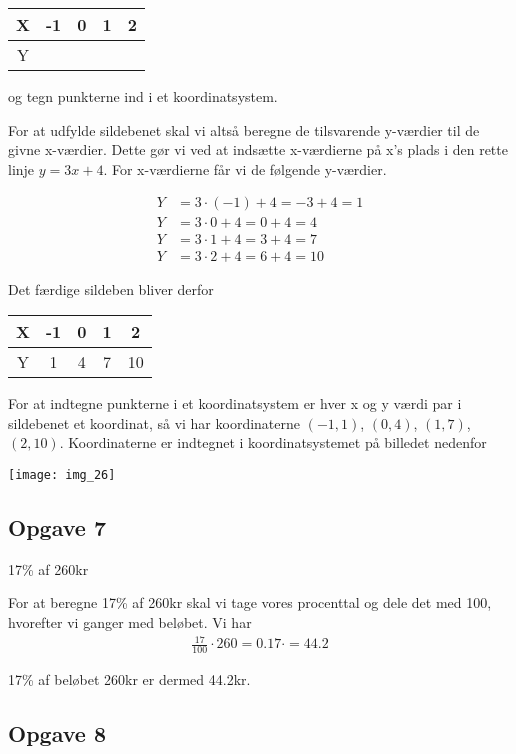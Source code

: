 \begin{tabular}{|c|c|c|c|c|}
\hline
X & -1 & 0 & 1 & 2 \\\hline
Y &  &  &  & \\\hline
\end{tabular}

og tegn punkterne ind i et koordinatsystem.


For at udfylde sildebenet skal vi altså beregne de tilsvarende y-værdier til de givne x-værdier. Dette gør vi ved at indsætte x-værdierne på x's plads i den rette linje $y = 3x +4$. For x-værdierne får vi de følgende y-værdier.

\begin{align*}
Y &= 3\cdot (-1) + 4 =-3 + 4 = 1 \\
Y &= 3\cdot 0 + 4 = 0 + 4 = 4\\
Y &= 3\cdot 1 + 4 = 3 + 4 = 7\\
Y &= 3\cdot 2 + 4 = 6 + 4 = 10
\end{align*}

Det færdige sildeben bliver derfor 

\begin{tabular}{|c|c|c|c|c|}
\hline
X & -1 & 0 & 1 & 2 \\\hline
Y & 1 & 4 & 7 & 10\\\hline
\end{tabular}

For at indtegne punkterne i et koordinatsystem er hver x og y værdi par i sildebenet et koordinat, så vi har koordinaterne $(-1,1)$, $(0,4)$, $(1,7)$, $(2,10)$. Koordinaterne er indtegnet i koordinatsystemet på billedet nedenfor

\texttt{[image: img\_26]}



\subsection{Opgave 7}
17\% af 260kr

For at beregne 17\% af 260kr skal vi tage vores procenttal og dele det med 100, hvorefter vi ganger med beløbet. Vi har
\begin{align*}
\frac{17}{100}\cdot 260 = 0.17\cdot = 44.2
\end{align*}

17\% af beløbet 260kr er dermed 44.2kr.

\subsection{Opgave 8}

